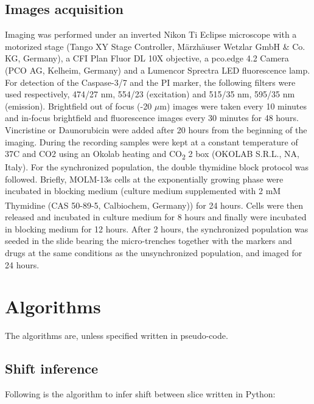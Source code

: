 \documentclass[pdftex,12pt,a4paper]{report}
\begin{document}
\begin{appendices}
\section{Images acquisition}
\label{appendix:imageacquisition}


Imaging was performed under an inverted Nikon Ti Eclipse microscope with a motorized stage (Tango XY Stage Controller, M\"arzh\"auser Wetzlar GmbH \& Co. KG, Germany), a CFI Plan Fluor DL 10X objective, a pco.edge 4.2 Camera (PCO AG, Kelheim, Germany) and a Lumencor Sprectra LED fluorescence lamp. For detection of the Caspase-3/7 and the PI marker, the following filters were used respectively, 474/27 nm, 554/23 (excitation) and 515/35 nm, 595/35 nm (emission). Brightfield out of focus (-20 $\mu$m) images were taken every 10 minutes and in-focus  brightfield and fluorescence images every 30 minutes for 48 hours. Vincristine or Daunorubicin were added after 20 hours from the beginning of the imaging. During the recording samples were kept at a constant temperature of 37\degree C and CO2 using an Okolab heating and CO\textsubscript{2} 2 box (OKOLAB S.R.L., NA, Italy). For the synchronized population, the double thymidine block protocol was followed. Briefly, MOLM-13s cells at the exponentially growing phase were incubated in blocking medium (culture medium supplemented with 2 mM Thymidine (CAS 50-89-5, Calbiochem\textsuperscript{\textregistered}, Germany)) for 24 hours. Cells were then released and incubated in culture medium for 8 hours and finally were incubated in blocking medium for 12 hours. After 2 hours, the synchronized population was seeded in the slide bearing the micro-trenches together with the markers and drugs at the same conditions as the unsynchronized population, and imaged for 24 hours.

\chapter{Algorithms}
\label{appendix:algo}

The algorithms are, unless specified written in pseudo-code.

\section*{Shift inference} 


Following is the algorithm to infer shift between slice written in Python:


\end{appendices}
\end{document}
